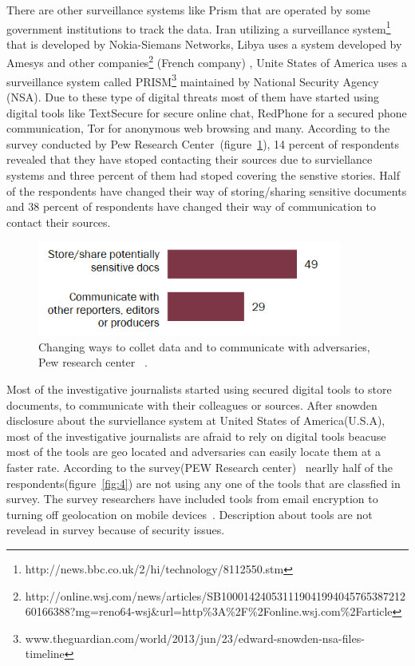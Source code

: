 There are other surveillance systems like Prism  that are operated by some government institutions to track the data. Iran utilizing a surveillance system\footnote{http://news.bbc.co.uk/2/hi/technology/8112550.stm} that is developed by Nokia-Siemans Networks, Libya uses a system developed by Amesys and other companies\footnote{http://online.wsj.com/news/articles/SB10001424053111904199404576538721260166388?mg=reno64-wsj\&url=http\%3A\%2F\%2Fonline.wsj.com\%2Farticle} (French company) , Unite States of America uses a surveillance system called PRISM\footnote{www.theguardian.com/world/2013/jun/23/edward-snowden-nsa-files-timeline} maintained by National Security Agency (NSA). Due to these type of digital threats most of them  have started using digital tools like TextSecure for secure online chat, RedPhone for a secured phone communication, Tor for anonymous web browsing and many.  According to the survey conducted by Pew Research Center~\cite{ia2p}(figure~\ref{fig:3}), 14 percent of respondents revealed that they have stoped contacting their sources due to surviellance systems and three percent of them had stoped covering the senstive stories. Half of the respondents have changed their way of storing/sharing sensitive documents and 38 percent of respondents have changed their way of communication to contact their sources. \\
 \begin{figure}[ht!]
 	\centering
 	\includegraphics[width=100mm]{4.png}
 	\caption{Changing ways to collet data and to communicate with adversaries, Pew research center ~\cite{ia2p}.}
 	\label{fig:3}
 \end{figure}
Most of the investigative journalists started using secured digital tools to store documents, to communicate with their colleagues or sources. After snowden disclosure about the surviellance system at United States of America(U.S.A), most of the investigative journalists are afraid to rely on digital tools beacuse most of the tools are geo located and adversaries can easily locate them at a faster rate. According to the survey(PEW Research center)~\cite{ia2p} nearlly half of the respondents(figure~\ref{fig:4}) are not using any one of the tools that are classfied in survey. The survey researchers have included tools from email encryption to turning off geolocation on mobile devices~\cite{ia2p}. Description about tools are not revelead in survey because of security issues.\\
